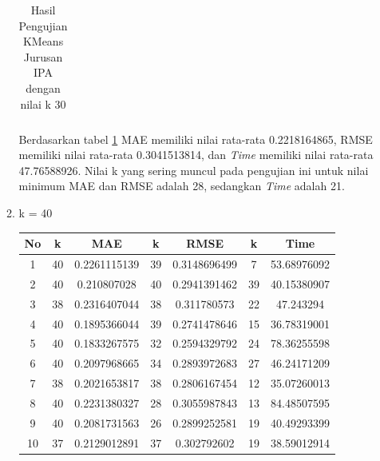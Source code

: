 \begin{enumerate}
\begin{enumerate}
\begin{longtable}[H]{|c|c|c|c|c|c|c|}
                        \caption{Hasil Pengujian KMeans Jurusan IPA dengan nilai k 30}
                        \label{tab:ipa k = 30}
                    \end{longtable}
                \endgroup
                
                Berdasarkan tabel \ref{tab:ipa k = 30} MAE memiliki nilai rata-rata 0.2218164865, RMSE memiliki nilai rata-rata 0.3041513814, dan \textit{Time} memiliki nilai rata-rata 47.76588926. Nilai k yang sering muncul pada pengujian ini untuk nilai minimum MAE dan RMSE adalah 28, sedangkan \textit{Time} adalah 21.
                
            \item k = 40 \\
                \begingroup
                \renewcommand\arraystretch{1.5}
                    \begin{longtable}[H]{|c|c|c|c|c|c|c|}
                        \hline
                        No & k & MAE & k & RMSE & k & Time \\
                        \hline
                        1 & 40 & 0.2261115139 & 39 & 0.3148696499 & 7 & 53.68976092\\
                        \hline
                        2 & 40 & 0.210807028 & 40 & 0.2941391462 & 39 & 40.15380907\\
                        \hline
                        3 & 38 & 0.2316407044 & 38 & 0.311780573 & 22 & 47.243294\\
                        \hline
                        4 & 40 & 0.1895366044 & 39 & 0.2741478646 & 15 & 36.78319001\\
                        \hline
                        5 & 40 & 0.1833267575 & 32 & 0.2594329792 & 24 & 78.36255598\\
                        \hline
                        6 & 40 & 0.2097968665 & 34 & 0.2893972683 & 27 & 46.24171209\\
                        \hline
                        7 & 38 & 0.2021653817 & 38 & 0.2806167454 & 12 & 35.07260013\\
                        \hline
                        8 & 40 & 0.2231380327 & 28 & 0.3055987843 & 13 & 84.48507595\\
                        \hline
                        9 & 40 & 0.2081731563 & 26 & 0.2899252581 & 19 & 40.49293399\\
                        \hline
                        10 & 37 & 0.2129012891 & 37 & 0.302792602 & 19 & 38.59012914\\
                        \hline
                        

\end{longtable}
\end{enumerate}
\end{enumerate}
